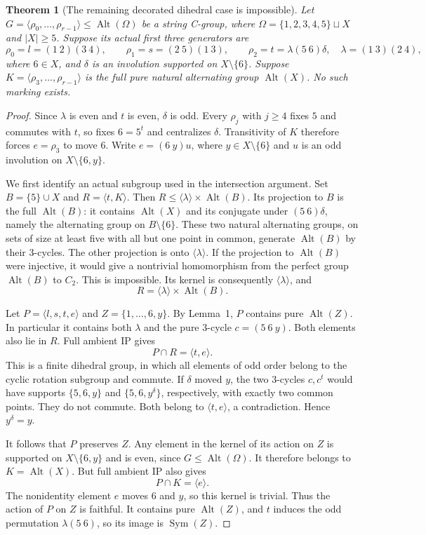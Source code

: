 \documentclass[11pt,a4paper]{article}
\newtheorem{theorem}[lemma]{Theorem}
\newcommand{\gen}[1]{\langle#1\rangle}
\newcommand{\Alt}{\operatorname{Alt}}
\newcommand{\Sym}{\operatorname{Sym}}
\begin{document}
\begin{theorem}[The remaining decorated dihedral case is impossible]
Let $G=\gen{\rho_0,\ldots,\rho_{r-1}}\leq\Alt(\Omega)$
be a string C-group, where
$\Omega=\{1,2,3,4,5\}\sqcup X$ and $|X|\geq5$.
Suppose its actual first three generators are
\[
 \rho_0=l=(1\ 2)(3\ 4),\qquad
 \rho_1=s=(2\ 5)(1\ 3),\qquad
 \rho_2=t=\lambda(5\ 6)\delta,
 \quad \lambda=(1\ 3)(2\ 4),
\]
where $6\in X$, and $\delta$ is an involution supported on
$X\setminus\{6\}$. Suppose
$K=\gen{\rho_3,\ldots,\rho_{r-1}}$ is the full pure natural
alternating group $\Alt(X)$. No such marking exists.
\end{theorem}
\begin{proof}
Since $\lambda$ is even and $t$ is even, $\delta$ is odd.
Every $\rho_j$ with $j\geq4$ fixes $5$ and commutes with $t$,
so fixes $6=5^t$ and centralizes $\delta$. Transitivity of $K$
therefore forces $e=\rho_3$ to move $6$. Write
$e=(6\ y)u$, where $y\in X\setminus\{6\}$ and $u$ is an
odd involution on $X\setminus\{6,y\}$.

We first identify an actual subgroup used in the intersection
argument. Set $B=\{5\}\cup X$ and $R=\gen{t,K}$.
Then $R\leq\gen\lambda\times\Alt(B)$. Its projection to $B$
is the full $\Alt(B)$: it contains $\Alt(X)$ and its conjugate
under $(5\ 6)\delta$, namely the alternating group on
$B\setminus\{6\}$. These two natural alternating groups,
on sets of size at least five with all but one point in common,
generate $\Alt(B)$ by their $3$-cycles. The other projection
is onto $\gen\lambda$. If the projection to $\Alt(B)$ were
injective, it would give a nontrivial homomorphism from the
perfect group $\Alt(B)$ to $C_2$. This is impossible.
Its kernel is consequently $\gen\lambda$, and
\[
                         R=\gen\lambda\times\Alt(B).
\]

Let $P=\gen{l,s,t,e}$ and $Z=\{1,\ldots,6,y\}$.
By Lemma~1, $P$ contains pure $\Alt(Z)$. In particular it
contains both $\lambda$ and the pure $3$-cycle $c=(5\ 6\ y)$.
Both elements also lie in $R$. Full ambient IP gives
\[
                           P\cap R=\gen{t,e}.
\]
This is a finite dihedral group, in which all elements of odd
order belong to the cyclic rotation subgroup and commute.
If $\delta$ moved $y$, the two $3$-cycles $c,c^t$ would have
supports $\{5,6,y\}$ and $\{5,6,y^\delta\}$, respectively,
with exactly two common points. They do not commute.
Both belong to $\gen{t,e}$, a contradiction. Hence
$y^\delta=y$.

It follows that $P$ preserves $Z$. Any element in the kernel
of its action on $Z$ is supported on $X\setminus\{6,y\}$
and is even, since $G\leq\Alt(\Omega)$. It therefore belongs
to $K=\Alt(X)$. But full ambient IP also gives
\[
                              P\cap K=\gen e.
\]
The nonidentity element $e$ moves $6$ and $y$, so this kernel
is trivial. Thus the action of $P$ on $Z$ is faithful.
It contains pure $\Alt(Z)$, and $t$ induces the odd permutation
$\lambda(5\ 6)$, so its image is $\Sym(Z)$.


\end{proof}
\end{document}
